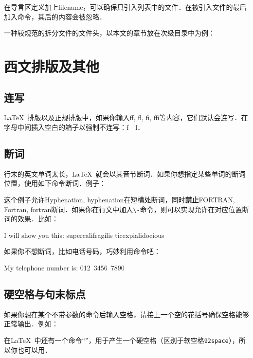 在导言区定义加上filename，可以确保只引入列表中的文件．在被引入文件的最后加入命令，其后的内容会被忽略．

一种较规范的拆分文件的文件头，以本文的章节放在次级目录中为例：
\begin{latex}
\end{latex}

\section{西文排版及其他}
\subsection{连写}
\LaTeX\ 排版以及正规排版中，如果你输入ff, fl, fi, ffi等内容，它们默认会连写．在字母中间插入空白的箱子以强制不连写：f~~l．

\subsection{断词}
行末的英文单词太长，\LaTeX\ 就会以其音节断词．如果你想指定某些单词的断词位置，使用如下命令断词．例子：
\begin{latex}
\end{latex}

这个例子允许Hyphenation, hyphenation在短横处断词，同时\textbf{禁止}FORTRAN, Fortran, fortran断词．如果你在行文中加入\verb|\-|命令，则可以实现允许在对应位置断词的效果．比如：

\begin{codeshow}
I will show you this:
su\-per\-cal\-i\-frag\-i\-lis\-%
tic\-ex\-pi\-al\-i\-do\-cious
\end{codeshow}

如果你不想断词，比如电话号码，巧妙利用命令吧：
\begin{latex}
My telephone number is: \mbox{012 3456 7890}
\end{latex}

\subsection{硬空格与句末标点}
如果你想在某个不带参数的命令后输入空格，请接上一个空的花括号确保空格能够正常输出．例如：

在\LaTeX\ 中还有一个命令“\texttt{\textvisiblespace}”，用于产生一个硬空格（区别于软空格\texttt{\char92space}），所以你也可以用．

